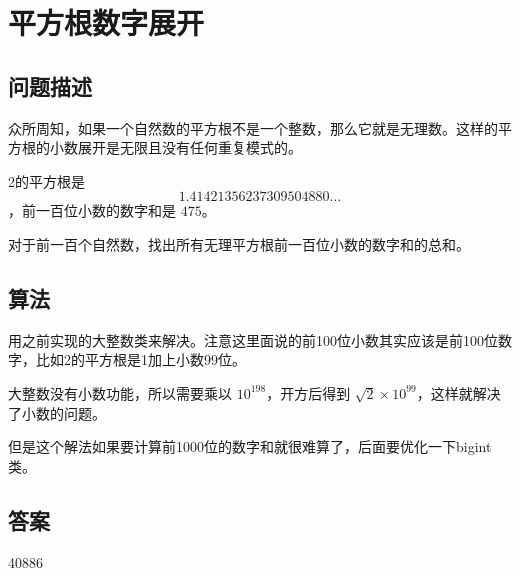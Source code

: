 \section{平方根数字展开}\label{sec:problem80}
\subsection{问题描述}
\begin{tcolorbox}
	众所周知，如果一个自然数的平方根不是一个整数，那么它就是无理数。这样的平方根的小数展开是无限且没有任何重复模式的。

	2的平方根是
	\[1.41421356237309504880 \ldots\]
	，前一百位小数的数字和是 \(475\)。

	对于前一百个自然数，找出所有无理平方根前一百位小数的数字和的总和。

\end{tcolorbox}

\subsection{算法}
用之前实现的大整数类来解决。注意这里面说的前100位小数其实应该是前100位数字，比如2的平方根是1加上小数99位。

大整数没有小数功能，所以需要乘以 $ 10^198 $，开方后得到 $ \sqrt{2} \times 10^99 $，这样就解决了小数的问题。

但是这个解法如果要计算前1000位的数字和就很难算了，后面要优化一下bigint类。
\subsection{答案}
40886
